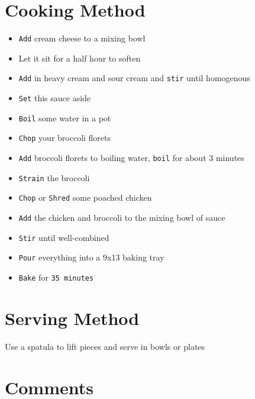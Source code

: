 \documentclass{article}
\begin{document}
\begin{multicols}{2}
\section{Cooking Method}
\begin{itemize}
	\item \verb|Add| cream cheese to a mixing bowl
	\item Let it sit for a half hour to soften
	\item \verb|Add| in heavy cream and sour cream and \verb|stir| until homogenous
	\item \verb|Set| this sauce aside
	\item \verb|Boil| some water in a pot
	\item \verb|Chop| your broccoli florets
	\item \verb|Add| broccoli florets to boiling water, \verb|boil| for about 3 minutes
	\item \verb|Strain| the broccoli
	\item \verb|Chop| or \verb|Shred| some poached chicken
	\item \verb|Add| the chicken and broccoli to the mixing bowl of sauce
	\item \verb|Stir| until well-combined
	\item \verb|Pour| everything into a 9x13 baking tray
	\item \verb|Bake| for \verb|35 minutes|
\end{itemize}

\section{Serving Method}
Use a spatula to lift pieces and serve in bowls or plates

\section{Comments}




\end{multicols}
\end{document}
